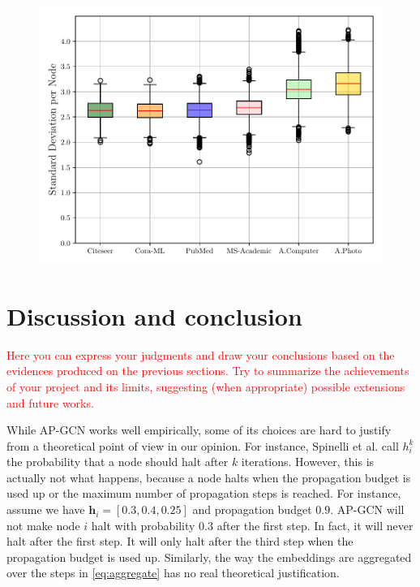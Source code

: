 \documentclass{gdl}
\begin{document}
\begin{figure}
        \centering
        \includegraphics[width=\textwidth]{Gumbel-AP-GCN_std_steps_per_node_boxplot.pdf}
        \caption{}
        \label{fig:cooperative-result} 
\end{figure}


\section{Discussion and conclusion}

\textcolor{red}{Here you can express your judgments and draw your conclusions based on the  evidences produced on the previous sections.
Try to summarize the achievements of your project and its limits, suggesting (when appropriate) possible extensions and future works.}

While AP-GCN works well empirically, some of its choices are hard to justify from a theoretical point of view in our opinion. For instance, Spinelli et al. call $h_i^k$ the probability that a node should halt after $k$ iterations. However, this is actually not what happens, because a node halts when the propagation budget is used up or the maximum number of propagation steps is reached. For instance, assume we have $\mathbf{h}_i = [0.3, 0.4, 0.25]$ and propagation budget $0.9$. AP-GCN will not make node $i$ halt with probability $0.3$ after the first step. In fact, it will never halt after the first step. It will only halt after the third step when the propagation budget is used up. Similarly, the way the embeddings are aggregated over the steps in \autoref{eq:aggregate} has no real theoretical justification.
\end{document}
